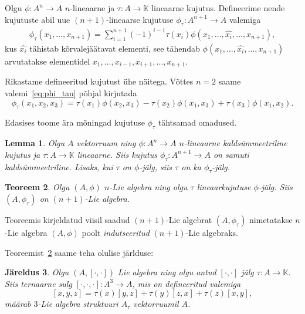 \documentclass[12pt,a4paper]{article}
\theoremstyle{plain}
\newtheorem{thm}{Teoreem}[section]
\newtheorem{lemma}[thm]{Lemma}
\newtheorem{jar}[thm]{Järeldus}
\theoremstyle{definition}
\newcommand{\K}{\mathbb{K}}
\newcommand{\col}{\colon}
\newcommand{\arr}{\rightarrow}
\newcommand{\brac}[2]{\ensuremath{\left[ #1, #2 \right]}}
\begin{document}
Olgu $\phi \col A^n \arr A$ $n$-lineaarne ja
$\tau \col A \arr \K$ lineaarne kujutus. Defineerime nende
kujutuste abil uue $(n+1)$-lineaarse kujutuse
$\phi_\tau \col A^{n+1} \arr A$ valemiga
\begin{align}\label{eq:phi_tau}
    \phi_\tau \left( x_1, \dots, x_{n+1} \right) =
    \sum_{i=1}^{n+1} (-1)^{i-1} \tau(x_i)
        \phi(x_1, \dots, \hat{x_i}, \dots, x_{n+1}),
\end{align}
kus $\hat{x_i}$ tähistab kõrvalejäätavat elementi, see tähendab
$\phi(x_1, \dots, \hat{x_i}, \dots, x_{n+1})$ arvutatakse elementidel
$x_1, \dots, x_{i-1}, x_{i+1}, \dots, x_{n+1}$.

Rikastame defineeritud kujutust ühe näitega. Võttes $n = 2$ saame
valemi~\ref{eq:phi_tau} põhjal kirjutada
\[
    \phi_\tau (x_1, x_2, x_3) =
        \tau(x_1) \phi(x_2, x_3) -
        \tau(x_2) \phi(x_1, x_3) +
        \tau(x_3) \phi(x_1, x_2).
\]

Edasises toome ära mõningad kujutuse $\phi_\tau$ tähtsamad omadused.

\begin{lemma}
    Olgu $A$ vektorruum ning $\phi \col A^n \arr A$ $n$-lineaarne kaldsümmeetriline kujutus
    ja $\tau \col A \arr \K$ lineaarne. Siis kujutus
    $\phi_\tau \col A^{n+1} \arr A$ on samuti kaldsümmeetriline. Lisaks,
    kui $\tau$ on $\phi$-jälg, siis $\tau$ on ka $\phi_\tau$-jälg.
\end{lemma}

\begin{thm}\label{thm:n+1_lie_alg}
    Olgu $(A, \phi)$ $n$-Lie algebra ning olgu $\tau$ lineaarkujutuse
    $\phi$-jälg. Siis $(A, \phi_\tau)$ on $(n+1)$-Lie algebra.
\end{thm}

Teoreemis kirjeldatud viisil saadud $(n+1)$-Lie algebrat $(A, \phi_\tau)$
nimetatakse $n$-Lie algebra $(A, \phi)$ poolt \emph{indutseeritud}
$(n+1)$-Lie algebraks.

Teoreemist~\ref{thm:n+1_lie_alg} saame teha olulise järlduse:

\begin{jar}
    Olgu $(A, \brac{\cdot}{\cdot})$ Lie algebra ning olgu antud
    $\brac{\cdot}{\cdot}$ jälg $\tau \col A \arr \K$. Siis ternaarne sulg
    $[ \cdot, \cdot, \cdot ] \col A^3 \arr A$, mis on defineeritud
    valemiga
    \[
        [x, y, z] = \tau(x)[y, z] + \tau(y)[z, x] + \tau(z)[x, y],
    \]
    määrab $3$-Lie algebra struktuuri $A_\tau$ vektorruumil $A$.
\end{jar}
\end{document}
